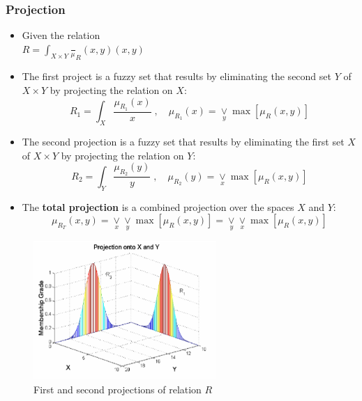 \documentclass{tron}
\begin{document}
\subsubsection{Projection}
\begin{itemize}
	\item Given the relation \\ $R= \int_{X\times Y} \frac{}\mu_R (x,y){(x,y)}$
	\item The first project is a fuzzy set that results by eliminating the second set $Y$ of $X\times Y$ by projecting the relation on $X$: \\
	\begin{equation}
		R_1 = \int_X \frac{\mu_{R_1}(x)}{x} \;, \quad \mu_{R_1}(x) = \underset{y}{\lor} \max[\mu_R (x,y)]
	\end{equation}
	\item The second projection is a fuzzy set that results by eliminating the first set $X$ of $X\times Y$ by projecting the relation on $Y$: \\
	\begin{equation}
		R_2 = \int_Y \frac{\mu_{R_2}(y)}{y} \;, \quad \mu_{R_2}(y) = \underset{x}{\lor} \max[\mu_R (x,y)]
	\end{equation}
	\item The \textbf{total projection} is a combined projection over the spaces $X$ and $Y$:\\
	\begin{equation}
		\mu_{R_T}(x,y) = \underset{x}{\lor}\underset{y}{\lor} \max[\mu_R (x,y)] = \underset{y}{\lor}\underset{x}{\lor} \max[\mu_R (x,y)]
	\end{equation}
\end{itemize}
\begin{figure}[H]
	\centering
	\includegraphics[height=200px]{Figs/Fuzzy/projection}
	\caption{First and second projections of relation $R$}
	\label{fig:fuzzy:projection:ex}
\end{figure}
\end{document}
